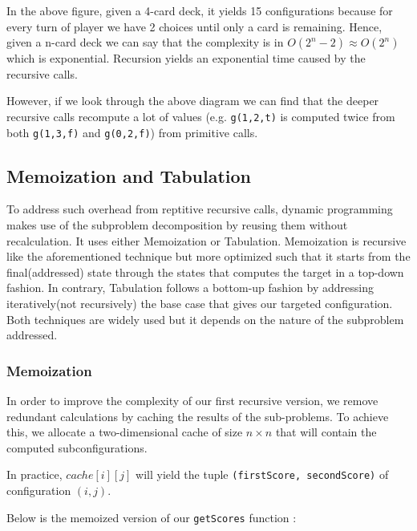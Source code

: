\documentclass[a4paper,12pt,fleqn]{article}
\newcommand\ezskip{\medskip\noindent}
\begin{document}
In the above figure, given a 4-card deck, it yields 15 configurations because for every turn of player we have 2 choices until only a card is remaining. Hence, given a n-card deck we can say that the complexity is in 
$O(2^n-2) \approx O(2^n)$ which is exponential. Recursion yields an exponential time caused by the recursive calls.

\ezskip
However, if we look through the above diagram we can find that the deeper recursive calls recompute a lot of values (e.g. \texttt{g(1,2,t)} is computed twice from both \texttt{g(1,3,f)} and \texttt{g(0,2,f)}) from primitive calls.

\newpage
\subsection{Memoization and Tabulation}
 To address such overhead from reptitive recursive calls, dynamic programming makes use of the subproblem decomposition by reusing them without recalculation. It uses either Memoization or Tabulation. Memoization is recursive like the aforementioned technique but more optimized such that it starts from the final(addressed) state through the states that computes the target in a top-down fashion. In contrary, Tabulation follows a bottom-up fashion by addressing iteratively(not recursively) the base case that gives our targeted configuration. Both techniques are widely used but it depends on the nature of the subproblem addressed. 

\subsubsection{Memoization} \label{susub:memoization}

In order to improve the complexity of our first recursive version, we remove redundant calculations by caching the results of the sub-problems. To achieve this, we allocate a two-dimensional cache of size $n \times n$ that will contain the computed subconfigurations.

In practice, $cache[i][j]$ will yield the tuple \texttt{(firstScore, secondScore)} of configuration $(i,j)$.

\ezskip
Below is the memoized version of our \texttt{getScores} function :
\end{document}
